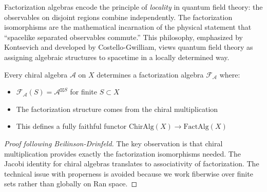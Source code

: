 \begin{remark}
Factorization algebras encode the principle of \emph{locality} in quantum field theory: the observables 
on disjoint regions combine independently. The factorization isomorphisms are the mathematical incarnation 
of the physical statement that ``spacelike separated observables commute.'' This philosophy, emphasized by 
Kontsevich and developed by Costello-Gwilliam, views quantum field theory as assigning algebraic structures 
to spacetime in a locally determined way.
\end{remark}

\begin{theorem}\label{thm:chiral-as-fact}
Every chiral algebra $\mathcal{A}$ on $X$ determines a factorization algebra $\mathcal{F}_\mathcal{A}$ where:
\begin{itemize}
\item $\mathcal{F}_\mathcal{A}(S) = \mathcal{A}^{\boxtimes S}$ for finite $S \subset X$
\item The factorization structure comes from the chiral multiplication
\item This defines a fully faithful functor $\text{ChirAlg}(X) \to \text{FactAlg}(X)$
\end{itemize}
\end{theorem}

\begin{proof}[Proof following Beilinson-Drinfeld]
The key observation is that chiral multiplication provides exactly the factorization isomorphisms needed.
The Jacobi identity for chiral algebras translates to associativity of factorization. The technical 
issue with properness is avoided because we work fiberwise over finite sets rather than globally on Ran space.
\end{proof}


